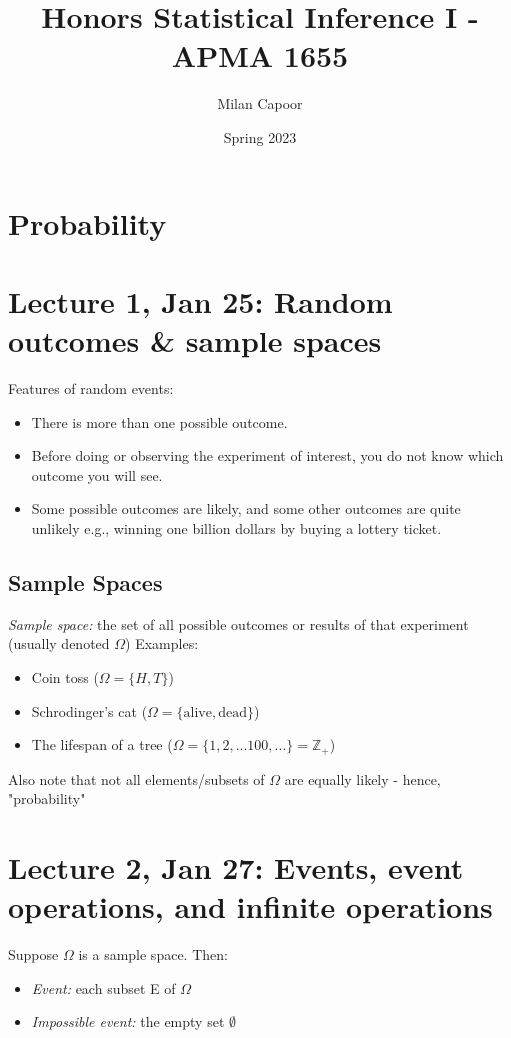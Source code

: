 \documentclass[12pt]{article}
\title{Honors Statistical Inference I - APMA 1655}
\author{Milan Capoor}
\date{Spring 2023}
\begin{document}
\maketitle
\section*{\textbf{Probability}}
\section{Lecture 1, Jan 25: Random outcomes \& sample spaces}
Features of random events:
\begin{itemize}
    \item There is more than one possible outcome.
    \item Before doing or observing the experiment of interest, you do not know which outcome you will see. \item Some possible outcomes are likely, and some other outcomes are quite unlikely e.g., winning one billion dollars by buying a lottery ticket.
\end{itemize}

\subsection*{Sample Spaces}
\emph{Sample space:} the set of all possible outcomes or results of that experiment (usually denoted $\Omega$)
Examples:
\begin{itemize}
    \item Coin toss ($\Omega = \{H, T\}$)
    \item Schrodinger's cat ($\Omega = \{\text{alive}, \text{dead}\}$)
    \item The lifespan of a tree ($\Omega = \{1, 2, ... 100, ...\} = \mathbb{Z}_+$)
\end{itemize}

Also note that not all elements/subsets of $\Omega$ are equally likely - hence, "probability"

\section{Lecture 2, Jan 27: Events, event operations, and infinite operations}
Suppose $\Omega$ is a sample space. Then:
\begin{itemize}
    \item \emph{Event:} each subset E of $\Omega$
    \item \emph{Impossible event:} the empty set $\emptyset$
\end{itemize}
\end{document}
